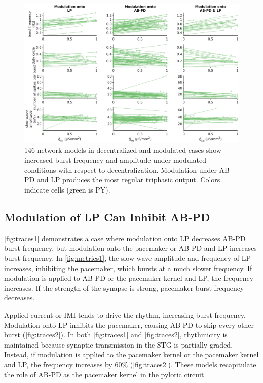 \begin{figure}
	\centering
	\includegraphics[width=1.0\linewidth]{gfx/all-modulation/metrics_PY}
	\caption[All optimized ABPD models in decentralized and modulated cases]{146 network models in decentralized and modulated cases show increased burst frequency and amplitude under modulated conditions with respect to decentralization. Modulation under \acs{AB}-\acs{PD} and \acs{LP} produces the most regular triphasic output. Colors indicate cells (green is \acs{PY}).}
	\label{fig:metricspy}
\end{figure}

\FloatBarrier

\subsection{Modulation of LP Can Inhibit AB-PD}

\autoref{fig:traces1} demonstrates a case where modulation onto \acs{LP} decreases \acs{AB}-\acs{PD} burst frequency, but modulation onto the pacemaker or \acs{AB}-\acs{PD} and \acs{LP} increases burst frequency. In \autoref{fig:metrics1}, the slow-wave amplitude and frequency of \acs{LP} increases, inhibiting the pacemaker, which bursts at a much slower frequency. If modulation is applied to \acs{AB}-\acs{PD} or the pacemaker kernel and \acs{LP}, the frequency increases. If the strength of the synapse is strong, pacemaker burst frequency decreases.

Applied current or \acs{IMI} tends to drive the rhythm, increasing burst frequency\autocite{DrionIonchanneldegeneracy2015,EisenMechanismsunderlyingpattern1982}. Modulation onto \acs{LP} inhibits the pacemaker, causing \acs{AB}-\acs{PD} to skip every other burst (\autoref{fig:traces2}). In both \autoref{fig:traces1} and \autoref{fig:traces2}, rhythmicity is maintained because synaptic transmission in the \acs{STG} is partially graded. Instead, if modulation is applied to the pacemaker kernel or the pacemaker kernel and \acs{LP}, the frequency increases by 60\% (\autoref{fig:traces2}). These models recapitulate the role of \acs{AB}-\acs{PD} as the pacemaker kernel in the pyloric circuit. 

